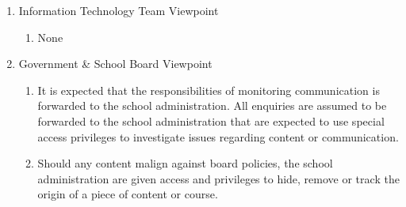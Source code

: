 \documentclass[]{article}
\begin{document}
\begin{enumerate}[{BE}1.]
\begin{enumerate}[{VP1}.1]
\begin{enumerate}
			\end{enumerate}
		\item Information Technology Team Viewpoint
			\begin{enumerate}
				\item None
			\end{enumerate}
		\item Government \& School Board Viewpoint
			\begin{enumerate}
				\item It is expected that the responsibilities of monitoring communication
is forwarded to the school administration. All enquiries are assumed to be
forwarded to the school administration that are expected to use special access
privileges to investigate issues regarding content or communication.
				\item Should any content malign against board policies, the school
administration are given access and privileges to hide, remove or track the
origin of a piece of content or course.
			\end{enumerate}
	\end{enumerate}


\end{enumerate}
\end{document}
